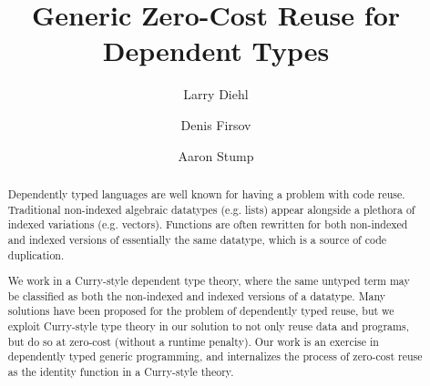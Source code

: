 \documentclass[acmsmall,screen]{acmart}
\begin{document}
\title{Generic Zero-Cost Reuse for Dependent Types}



\author{Larry Diehl}
\author{Denis Firsov}
\author{Aaron Stump}

\begin{abstract}
Dependently typed languages are well known for having a problem with
code reuse. Traditional non-indexed algebraic datatypes (e.g. lists)
appear alongside a plethora of indexed variations (e.g. vectors).
Functions are often rewritten for both non-indexed and indexed versions of
essentially the same datatype, which is a source of code duplication.

We work in a Curry-style dependent type theory, where the same untyped
term may be classified as both the non-indexed and indexed versions of
a datatype. Many solutions have been proposed for the problem of
dependently typed reuse, but we exploit Curry-style type theory in our
solution to not only reuse data and programs, but do so at zero-cost
(without a runtime penalty). Our work is an exercise in dependently
typed generic programming, and internalizes the process
of zero-cost reuse as the identity function in a
Curry-style theory.
\end{abstract}
\end{document}
